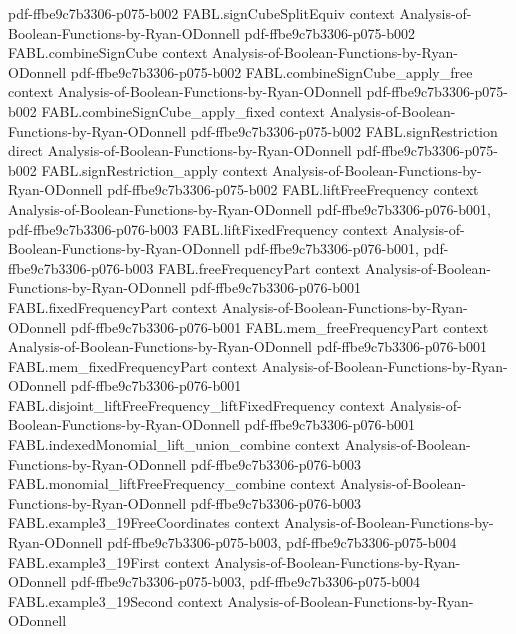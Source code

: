 \begin{theorem}
  {pdf-ffbe9c7b3306-p075-b002}
\proofstep
  {FABL.signCubeSplitEquiv}
  {context}
  {Analysis-of-Boolean-Functions-by-Ryan-ODonnell}
  {pdf-ffbe9c7b3306-p075-b002}
\proofstep
  {FABL.combineSignCube}
  {context}
  {Analysis-of-Boolean-Functions-by-Ryan-ODonnell}
  {pdf-ffbe9c7b3306-p075-b002}
\proofstep
  {FABL.combineSignCube_apply_free}
  {context}
  {Analysis-of-Boolean-Functions-by-Ryan-ODonnell}
  {pdf-ffbe9c7b3306-p075-b002}
\proofstep
  {FABL.combineSignCube_apply_fixed}
  {context}
  {Analysis-of-Boolean-Functions-by-Ryan-ODonnell}
  {pdf-ffbe9c7b3306-p075-b002}
\proofstep
  {FABL.signRestriction}
  {direct}
  {Analysis-of-Boolean-Functions-by-Ryan-ODonnell}
  {pdf-ffbe9c7b3306-p075-b002}
\proofstep
  {FABL.signRestriction_apply}
  {context}
  {Analysis-of-Boolean-Functions-by-Ryan-ODonnell}
  {pdf-ffbe9c7b3306-p075-b002}
\proofstep
  {FABL.liftFreeFrequency}
  {context}
  {Analysis-of-Boolean-Functions-by-Ryan-ODonnell}
  {pdf-ffbe9c7b3306-p076-b001,
    pdf-ffbe9c7b3306-p076-b003}
\proofstep
  {FABL.liftFixedFrequency}
  {context}
  {Analysis-of-Boolean-Functions-by-Ryan-ODonnell}
  {pdf-ffbe9c7b3306-p076-b001,
    pdf-ffbe9c7b3306-p076-b003}
\proofstep
  {FABL.freeFrequencyPart}
  {context}
  {Analysis-of-Boolean-Functions-by-Ryan-ODonnell}
  {pdf-ffbe9c7b3306-p076-b001}
\proofstep
  {FABL.fixedFrequencyPart}
  {context}
  {Analysis-of-Boolean-Functions-by-Ryan-ODonnell}
  {pdf-ffbe9c7b3306-p076-b001}
\proofstep
  {FABL.mem_freeFrequencyPart}
  {context}
  {Analysis-of-Boolean-Functions-by-Ryan-ODonnell}
  {pdf-ffbe9c7b3306-p076-b001}
\proofstep
  {FABL.mem_fixedFrequencyPart}
  {context}
  {Analysis-of-Boolean-Functions-by-Ryan-ODonnell}
  {pdf-ffbe9c7b3306-p076-b001}
\proofstep
  {FABL.disjoint_liftFreeFrequency_liftFixedFrequency}
  {context}
  {Analysis-of-Boolean-Functions-by-Ryan-ODonnell}
  {pdf-ffbe9c7b3306-p076-b001}
\proofstep
  {FABL.indexedMonomial_lift_union_combine}
  {context}
  {Analysis-of-Boolean-Functions-by-Ryan-ODonnell}
  {pdf-ffbe9c7b3306-p076-b003}
\proofstep
  {FABL.monomial_liftFreeFrequency_combine}
  {context}
  {Analysis-of-Boolean-Functions-by-Ryan-ODonnell}
  {pdf-ffbe9c7b3306-p076-b003}
\proofstep
  {FABL.example3_19FreeCoordinates}
  {context}
  {Analysis-of-Boolean-Functions-by-Ryan-ODonnell}
  {pdf-ffbe9c7b3306-p075-b003,
    pdf-ffbe9c7b3306-p075-b004}
\proofstep
  {FABL.example3_19First}
  {context}
  {Analysis-of-Boolean-Functions-by-Ryan-ODonnell}
  {pdf-ffbe9c7b3306-p075-b003,
    pdf-ffbe9c7b3306-p075-b004}
\proofstep
  {FABL.example3_19Second}
  {context}
  {Analysis-of-Boolean-Functions-by-Ryan-ODonnell}

\end{theorem}

